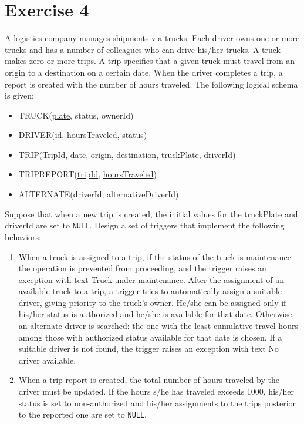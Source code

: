 \section{Exercise 4}

A logistics company manages shipments via trucks. Each driver owns one or more trucks and has a number of colleagues who can drive his/her trucks. 
A truck makes zero or more trips. 
A trip specifies that a given truck must travel from an origin to a destination on a certain date. 
When the driver completes a trip, a report is created with the number of hours traveled. 
The following logical schema is given:
\begin{itemize}
    \item TRUCK(\underline{plate}, status, ownerId) 
    \item DRIVER(\underline{id}, hoursTraveled, status) 
    \item TRIP(\underline{TripId}, date, origin, destination, truckPlate, driverId)
    \item TRIPREPORT(\underline{tripId}, \underline{hoursTraveled})
    \item ALTERNATE(\underline{driverId}, \underline{alternativeDriverId})
\end{itemize}
Suppose that when a new trip is created, the initial values for the truckPlate and driverId are set to \texttt{NULL}. 
Design a set of triggers that implement the following behaviors: 
\begin{enumerate}
    \item When a truck is assigned to a trip, if the status of the truck is maintenance the operation is prevented from proceeding, and the trigger raises an exception with text Truck under maintenance. 
        After the assignment of an available truck to a trip, a trigger tries to automatically assign a suitable driver, giving priority to the truck's owner. 
        He/she can be assigned only if his/her status is authorized and he/she is available for that date. 
        Otherwise, an alternate driver is searched: the one with the least cumulative travel hours among those with authorized status available for that date is chosen. 
        If a suitable driver is not found, the trigger raises an exception with text No driver available.
    \item When a trip report is created, the total number of hours traveled by the driver must be updated. 
        If the hours s/he has traveled exceeds 1000, his/her status is set to non-authorized and his/her assignments to the trips posterior to the reported one are set to \texttt{NULL}.
\end{enumerate}

